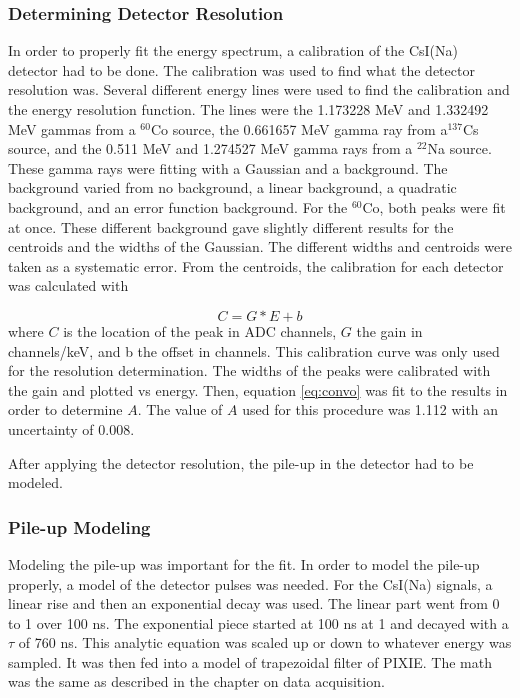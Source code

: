 \documentclass[../MaxHughesThesis.tex]{subfiles}
\begin{document}
\subsubsection{Determining Detector Resolution}
In order to properly fit the energy spectrum, a calibration of the CsI(Na) detector had to be done.
The calibration was used to find what the detector resolution was.
Several different energy lines were used to find the calibration and the energy resolution function.
The lines were the 1.173228 MeV and 1.332492 MeV gammas from a $^{60}$Co source, the 0.661657 MeV gamma ray from a$^{137}$Cs source, and the 0.511 MeV and 1.274527 MeV gamma rays from a $^{22}$Na source.
These gamma rays were fitting with a Gaussian and a background.
The background varied from no background, a linear background, a quadratic background, and an error function background.
For the $^{60}$Co, both peaks were fit at once.
These different background gave slightly different results for the centroids and the widths of the Gaussian.
The different widths and centroids were taken as a systematic error.
From the centroids, the calibration for each detector was calculated with 

\begin{equation}
	C = G * E + b
	\label{eq:cal}
\end{equation}
where $C$ is the location of the peak in ADC channels, $G$ the gain in channels/keV, and b the offset in channels.
This calibration curve was only used for the resolution determination.
The widths of the peaks were calibrated with the gain and plotted vs energy.
Then, equation \ref{eq:convo} was fit to the results in order to determine $A$.
The value of $A$ used for this procedure was 1.112 with an uncertainty of 0.008.

After applying the detector resolution, the pile-up in the detector had to be modeled.

\subsubsection{Pile-up Modeling}
Modeling the pile-up was important for the fit. 
In order to model the pile-up properly, a model of the detector pulses was needed. 
For the CsI(Na) signals, a linear rise and then an exponential decay was used.
The linear part went from 0 to 1 over 100 ns. 
The exponential piece started at 100 ns at 1 and decayed with a $\tau$ of 760 ns.
This analytic equation was scaled up or down to whatever energy was sampled.
It was then fed into a model of trapezoidal filter of PIXIE. 
The math was the same as described in the chapter on data acquisition.
\end{document}

